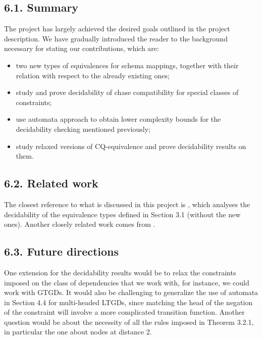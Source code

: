 \documentclass[11pt, a4paper, dvipsnames]{article}
\begin{document}
\subsection{6.1. Summary}
The project has largely achieved the desired goals outlined in the project description. We have gradually introduced the reader to the background necessary for stating our contributions, which are:
\begin{itemize}
	\item two new types of equivalences for schema mappings, together with their relation with respect to the already existing ones;
	\item study and prove decidability of chase compatibility for special classes of constraints;
	\item use automata approach to obtain lower complexity bounds for the decidability checking mentioned previously;
	\item study relaxed versions of CQ-equivalence and prove decidability results on them.
\end{itemize}
\subsection{6.2. Related work}
The closest reference to what is discussed in this project is \cite{equivalence}, which analyses the decidability of the equivalence types defined in Section 3.1 (without the new ones). Another closely related work comes from \cite{theory}.
\subsection{6.3. Future directions}
One extension for the decidability results would be to relax the constraints imposed on the class of dependencies that we work with, for instance, we could work with GTGDs. It would also be challenging to generalize the use of automata in Section 4.4 for multi-headed LTGDs, since matching the head of the negation of the constraint will involve a more complicated transition function. Another question would be about the necessity of all the rules imposed in Theorem 3.2.1, in particular the one about nodes at distance 2.

\newpage
\end{document}
